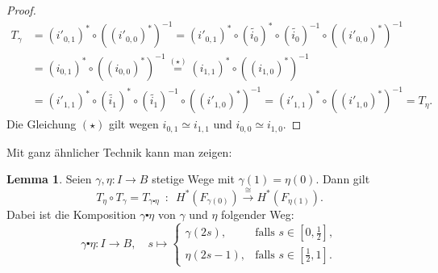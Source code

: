 \documentclass[11pt, a4paper, german]{article}
\theoremstyle{definition}
\newtheorem*{lem}{Lemma}
\theoremstyle{remark}
\begin{document}
\begin{proof}
\begin{align*}
    T_\gamma &
    = (i'_{0,1})^* \circ ((i'_{0,0})^*)^{-1}
    = (i'_{0,1})^* \circ (\widetilde{i_0})^* \circ (\widetilde{i_0})^{-1} \circ ((i'_{0,0})^*)^{-1} \\
    & = (i_{0,1})^* \circ ((i_{0,0})^*)^{-1}
    \stackrel{(\star)}{=} (i_{1,1})^* \circ ((i_{1,0})^*)^{-1} \\
    & = (i'_{1,1})^* \circ (\widetilde{i_1})^* \circ (\widetilde{i_1})^{-1} \circ ((i'_{1,0})^*)^{-1}
    = (i'_{1,1})^* \circ ((i'_{1,0})^*)^{-1}
    = T_\eta.
  \end{align*}
  Die Gleichung $(\star)$ gilt wegen $i_{0,1} \simeq i_{1,1}$ und $i_{0,0} \simeq i_{1,0}$.
\end{proof}

Mit ganz ähnlicher Technik kann man zeigen:

\begin{lem}
  Seien $\gamma, \eta : I \to B$ stetige Wege mit $\gamma(1) = \eta(0)$.
  Dann gilt
  \[ T_\eta \circ T_\gamma = T_{\gamma \centerdot \eta} \enspace:\enspace H^*(F_{\gamma(0)}) \xrightarrow{\cong} H^*(F_{\eta(1)}). \]
  Dabei ist die Komposition $\gamma \centerdot \eta$ von $\gamma$ und $\eta$ folgender Weg:
  \[
    \gamma \centerdot \eta : I \to B, \quad
    s \mapsto \begin{cases}
      \gamma(2s), & \text{falls } s \in [0, \tfrac{1}{2}], \\
      \eta(2s - 1), & \text{falls } s \in [\tfrac{1}{2}, 1].
    \end{cases}
  \]
\end{lem}
\end{document}

